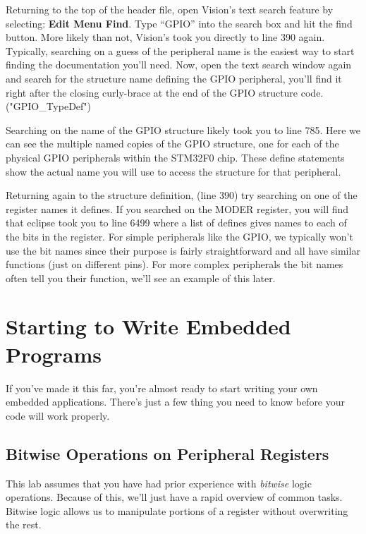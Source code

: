 \documentclass[11pt,fleqn]{book} %
\begin{document}
Returning to the top of the header file, open {\textmu}Vision's text search feature by selecting: \textbf{Edit Menu \textrightarrow Find}. Type ``GPIO'' into the search box and hit the find button. More likely than not, {\textmu}Vision's took you directly to line 390 again. Typically, searching on a guess of the peripheral name is the easiest way to start finding the documentation you'll need. Now, open the text search window again and search for the structure name defining the GPIO peripheral, you'll find it right after the closing curly-brace at the end of the GPIO structure code. ("GPIO\_TypeDef")

Searching on the name of the GPIO structure likely took you to line 785. Here we can see the multiple named copies of the GPIO structure, one for each of the physical GPIO peripherals within the STM32F0 chip. These define statements show the actual name you will use to access the structure for that peripheral.

Returning again to the structure definition, (line 390) try searching on one of the register names it defines. If you searched on the MODER register, you will find that eclipse took you to line 6499 where a list of defines gives names to each of the bits in the register. For simple peripherals like the GPIO, we typically won't use the bit names since their purpose is fairly straightforward and all have similar functions (just on different pins). For more complex peripherals the bit names often tell you their function, we'll see an example of this later.


\section{Starting to Write Embedded Programs}

If you've made it this far, you're almost ready to start writing your own embedded applications. There's just a few thing you need to know before your code will work properly.


\subsection{Bitwise Operations on Peripheral Registers}

This lab assumes that you have had prior experience with \textit{bitwise} logic operations. Because of this, we'll just have a rapid overview of common tasks. Bitwise logic allows us to manipulate portions of a register without overwriting the rest.
\end{document}
